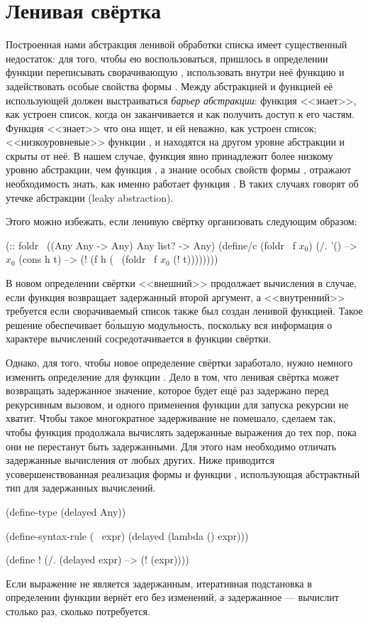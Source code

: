 \section[2]{Ленивая свёртка}%
Построенная нами абстракция ленивой обработки списка имеет существенный недостаток:
для того, чтобы ею воспользоваться, пришлось в определении функции  переписывать сворачивающую , использовать внутри неё функцию \s{!} и задействовать особые свойства формы . Между абстракцией и функцией её использующей должен выстраиваться \emph{барьер абстракции}: функция  <<знает>>, как устроен список, когда он заканчивается и как получить доступ к его частям. Функция  <<знает>> что она ищет, и ей неважно, как устроен список; <<низкоуровневые>> функции ,  и  находятся на другом уровне абстракции и скрыты от неё. В нашем случае, функция \s{!} явно принадлежит более низкому уровню абстракции, чем функция , а знание особых свойств формы , отражают необходимость знать, как именно работает функция . В таких случаях говорят об утечке абстракции (leaky abstraction).

Этого можно избежать, если ленивую свёртку организовать следующим образом:

\label{lazy-fold}
\begin{Definition}[emph={f,lst,h,t}]
(:: foldr~ ((Any Any -> Any) Any list? -> Any)
  (define/c (foldr~ f $x_0$)
    (/. '() --> $x_0$
        (cons h t) --> (! (f h (~ (foldr~ f $x_0$ (! t))))))))
\end{Definition}

\noindent
В новом определении свёртки <<внешний>> \s{!} продолжает вычисления в случае, если функция  возвращает задержанный второй аргумент, а <<внутренний>> требуется если сворачиваемый список также был создан ленивой функцией. Такое решение обеспечивает б\'{о}льшую модульность, поскольку вся информация о характере вычислений сосредотачивается в функции свёртки.

Однако, для того, чтобы новое определение свёртки заработало, нужно немного изменить определение для функции \s{!}. Дело в том, что ленивая свёртка может возвращать задержанное значение, которое будет ещё раз задержано перед рекурсивным вызовом, и одного применения функции \s{!} для запуска рекурсии не хватит. Чтобы такое многократное задерживание не помешало, сделаем так, чтобы функция \s{!} продолжала вычислять задержанные выражения до тех пор, пока они не перестанут быть задержанными. Для этого нам необходимо отличать задержанные вычисления от любых других. Ниже приводится усовершенствованная реализация формы \s{~} и функции \s{!}, использующая абстрактный тип для задержанных вычислений.
\begin{Definition}
(define-type (delayed Any))

(define-syntax-rule (~ expr)
  (delayed (lambda () expr)))

(define !
  (/. (delayed expr) --> (! (expr))))
\end{Definition}
\noindent
Если выражение не является задержанным, итеративная подстановка в определении функции \s{!} вернёт его без изменений, а задержанное --- вычислит столько раз, сколько потребуется.

